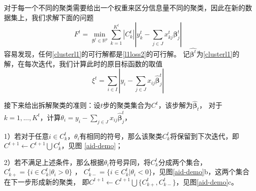 对于每一个不同的聚类需要给出一个权重来区分信息量不同的聚类，因此在新的数据集上，我们求解下面的问题
\begin{equation}\label{clusterl1}
    F^t =\underset{\bm{\beta}^t \in \mathbb{R}^{p}}{\operatorname{min}} 
    \sum_{k=1}^{K^t}|C_k^t||y_k^t - \sum_{j \in J}x_{kj}^t\bm{\beta}_j^t|
\end{equation}
容易发现，任何\eqref{clusterl1}的可行解都是\eqref{l1loss2}的可行解。
记$\hat{\bm{\beta}^t}$为\eqref{clusterl1}的解，在每次迭代，我们计算此时的原目标函数的取值
\begin{equation}
    \xi^t = \sum_{i \in I} |y_i - \sum_{j \in J}x_{ij}\hat{\bm{\beta}}_j^t|
\end{equation}

接下来给出拆解聚类的准则：设$t$步的聚类集合为$C^{t}$，该步解为$\hat{\bm{\beta}}_t$，
对于$k = 1, ..., K^t$，计算$\theta_i = y_i - \sum_{j \in J}x_{ij}\hat{\bm{\beta}}_j^t$，

1）若对于任意$i \in C_k^t$，$\theta_i$有相同的符号，那么该聚类$C^t_k$将保留到下次迭代，即$C^{t+1} \leftarrow C^{t+1}\bigcup C^t_k$，见图
\ref{aid-demo}；

2）若不满足上述条件，那么根据$\theta_i$符号异同，将$C^t_k$分成两个集合，$C_{k+}^t = \{i \in C_k^t | \theta_i > 0\}$ ，
$C_{k-}^t = \{i \in C_k^t | \theta_i < 0\}$，见图\ref{aid-demo}b，这两个集合在下一步形成新的聚类，
即$C^{t+1} \leftarrow C^{t+1}\bigcup \{ C_{k+}^t, C_{k-}^t\}$，见图\ref{aid-demo}c。

